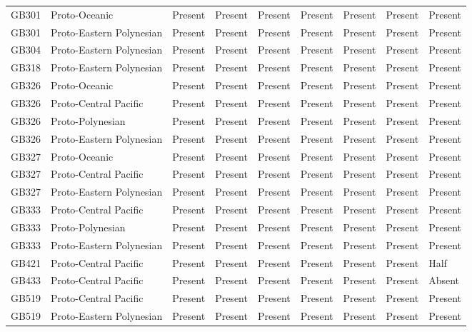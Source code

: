 \begin{longtable}{p{1.5cm}p{2.5cm}p{2.5cm}p{2.5cm}p{2.5cm}p{2.5cm}p{2.5cm}p{2.5cm}p{2.5cm}}
  GB301 & Proto-Oceanic & Present & Present & Present & Present & Present & Present & Present \\ 
  GB301 & Proto-Eastern Polynesian & Present & Present & Present & Present & Present & Present & Present \\ 
  GB304 & Proto-Eastern Polynesian & Present & Present & Present & Present & Present & Present & Present \\ 
  GB318 & Proto-Eastern Polynesian & Present & Present & Present & Present & Present & Present & Present \\ 
  GB326 & Proto-Oceanic & Present & Present & Present & Present & Present & Present & Present \\ 
  GB326 & Proto-Central Pacific & Present & Present & Present & Present & Present & Present & Present \\ 
  GB326 & Proto-Polynesian & Present & Present & Present & Present & Present & Present & Present \\ 
  GB326 & Proto-Eastern Polynesian & Present & Present & Present & Present & Present & Present & Present \\ 
  GB327 & Proto-Oceanic & Present & Present & Present & Present & Present & Present & Present \\ 
  GB327 & Proto-Central Pacific & Present & Present & Present & Present & Present & Present & Present \\ 
  GB327 & Proto-Eastern Polynesian & Present & Present & Present & Present & Present & Present & Present \\ 
  GB333 & Proto-Central Pacific & Present & Present & Present & Present & Present & Present & Present \\ 
  GB333 & Proto-Polynesian & Present & Present & Present & Present & Present & Present & Present \\ 
  GB333 & Proto-Eastern Polynesian & Present & Present & Present & Present & Present & Present & Present \\ 
  GB421 & Proto-Central Pacific & Present & Present & Present & Present & Present & Present & Half \\ 
  GB433 & Proto-Central Pacific & Present & Present & Present & Present & Present & Present & Absent \\ 
  GB519 & Proto-Central Pacific & Present & Present & Present & Present & Present & Present & Present \\ 
  GB519 & Proto-Eastern Polynesian & Present & Present & Present & Present & Present & Present & Present \\ 

\end{longtable}
